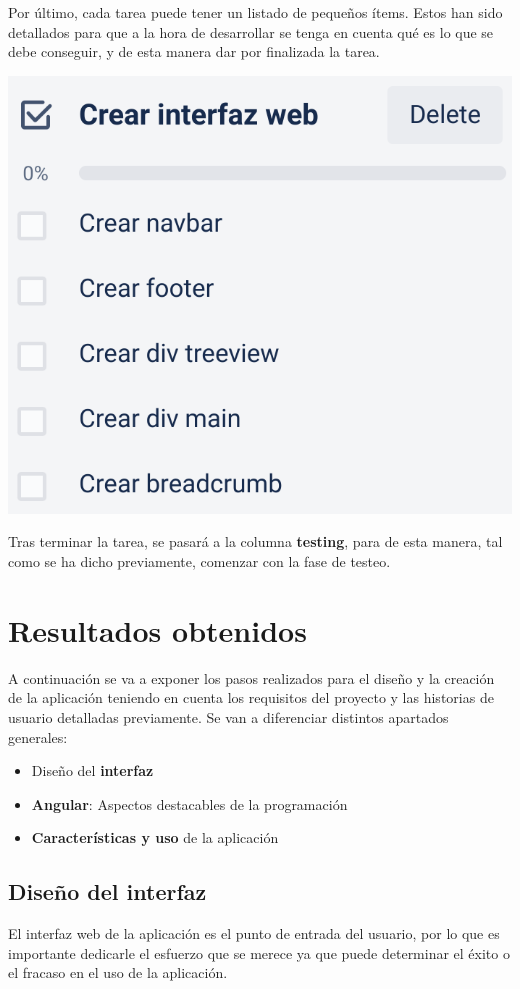 \documentclass{\ClassPath/viu-tfm-template}
\begin{document}





Por último, cada tarea puede tener un listado de pequeños ítems. Estos han sido detallados para que a la hora de desarrollar se tenga en cuenta qué es lo que se debe conseguir, y de esta manera dar por finalizada la tarea.
\begin{center}
    \includegraphics[width=0.4\linewidth]{img/tarea1.png}
\end{center}

Tras terminar la tarea, se pasará a la columna \textbf{testing}, para de esta manera, tal como se ha dicho previamente, comenzar con la fase de testeo.



\chapter{Resultados obtenidos}

A continuación se va a exponer los pasos realizados para el diseño y la creación de la aplicación teniendo en cuenta los requisitos del proyecto y las historias de usuario detalladas previamente. Se van a diferenciar distintos apartados generales:
\vspace{-10pt}
\begin{itemize}
    \item Diseño del \textbf{interfaz}
    \item \textbf{Angular}: Aspectos destacables de la programación
    \item \textbf{Características y uso} de la aplicación
\end{itemize}


\section{Diseño del interfaz}

El interfaz web de la aplicación es el punto de entrada del usuario, por lo que es importante dedicarle el esfuerzo que se merece ya que puede determinar el éxito o el fracaso en el uso de la aplicación.
\end{document}
